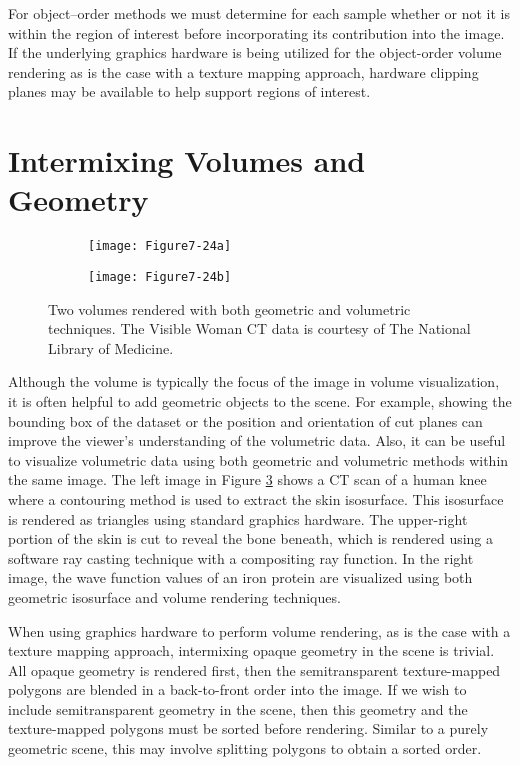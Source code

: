 For object--order methods we must determine for each sample whether or not it is within the region of interest before incorporating its contribution into the image. If the underlying graphics hardware is being utilized for the object-order volume rendering as is the case with a texture mapping approach, hardware clipping planes may be available to help support regions of interest.

\section{Intermixing Volumes and Geometry}

\begin{figure}[!htb]
	\centering
	\begin{subfigure}{0.48\linewidth}
		\centering
		\texttt{[image: Figure7-24a]}
		\caption*{}\label{fig:Figure7-24a}
	\end{subfigure}
	\hfill
	\begin{subfigure}{0.48\linewidth}
		\centering
		\texttt{[image: Figure7-24b]}
		\caption*{}\label{fig:Figure7-24b}
	\end{subfigure}%
	\caption{Two volumes rendered with both geometric and volumetric techniques. The Visible Woman CT data is courtesy of The National Library of Medicine.}
	\label{fig:Figure7-24}
\end{figure}

Although the volume is typically the focus of the image in volume visualization, it is often helpful to add geometric objects to the scene. For example, showing the bounding box of the dataset or the position and orientation of cut planes can improve the viewer's understanding of the volumetric data. Also, it can be useful to visualize volumetric data using both geometric and volumetric methods within the same image. The left image in Figure \ref{fig:Figure7-24} shows a CT scan of a human knee where a contouring method is used to extract the skin isosurface. This isosurface is rendered as triangles using standard graphics hardware. The upper-right portion of the skin is cut to reveal the bone beneath, which is rendered using a software ray casting technique with a compositing ray function. In the right image, the wave function values of an iron protein are visualized using both geometric isosurface and volume rendering techniques.

When using graphics hardware to perform volume rendering, as is the case with a texture mapping approach, intermixing opaque geometry in the scene is trivial. All opaque geometry is rendered first, then the semitransparent texture-mapped polygons are blended in a back-to-front order into the image. If we wish to include semitransparent geometry in the scene, then this geometry and the texture-mapped polygons must be sorted before rendering. Similar to a purely geometric scene, this may involve splitting polygons to obtain a sorted order.

